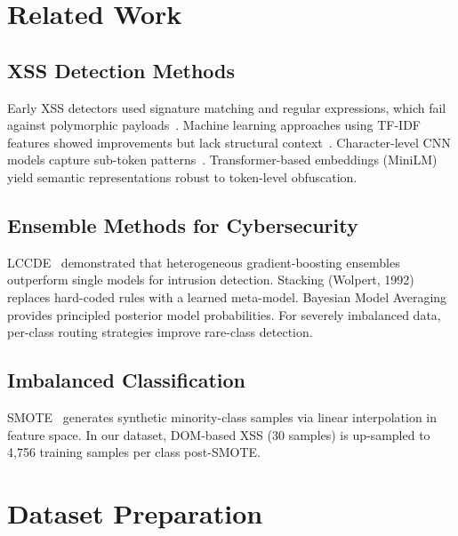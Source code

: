 \documentclass[conference]{IEEEtran}
\begin{document}
\section{Related Work}
\label{sec:related}

\subsection{XSS Detection Methods}

Early XSS detectors used signature matching and regular expressions, which
fail against polymorphic payloads~\cite{lccde2022}. Machine learning
approaches using TF-IDF features showed improvements but lack structural
context~\cite{caxf_lccde2024}. Character-level CNN models capture
sub-token patterns~\cite{charcnn_zhang2015}. Transformer-based embeddings
(MiniLM)~\cite{minilm2020} yield semantic representations robust to
token-level obfuscation.

\subsection{Ensemble Methods for Cybersecurity}

LCCDE~\cite{lccde2022} demonstrated that heterogeneous gradient-boosting
ensembles outperform single models for intrusion detection. Stacking
(Wolpert, 1992)~\cite{wolpert1992} replaces hard-coded rules with a learned
meta-model. Bayesian Model Averaging~\cite{hoeting1999} provides principled
posterior model probabilities. For severely imbalanced data, per-class
routing strategies improve rare-class detection.

\subsection{Imbalanced Classification}

SMOTE~\cite{smote2002} generates synthetic minority-class samples via linear
interpolation in feature space. In our dataset, DOM-based XSS (30 samples)
is up-sampled to 4,756 training samples per class post-SMOTE.

\section{Dataset Preparation}
\label{sec:dataset}
\end{document}
